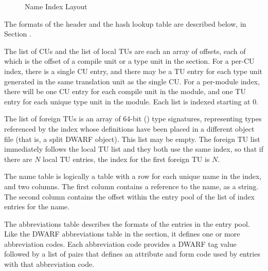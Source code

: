 \begin{figure}[p]
\begin{center}
\end{center}
\caption{Name Index Layout}
\label{fig:nameindexlayout}

\end{figure}

The formats of the header and the hash lookup table are described
below, in Section .

The list of CUs and the list of local TUs are each an array of
offsets, each of which is the offset of a compile unit or a type unit
in the \dotdebuginfo{} section. For a per-CU index, there is a single CU
entry, and there may be a TU entry for each type unit generated in the
same translation unit as the single CU. For a per-module index, there
will be one CU entry for each compile unit in the module, and one TU
entry for each unique type unit in the module. Each list is indexed
starting at 0.

The list of foreign TUs is an array of 64-bit (\DWFORMrefsigeight) type
signatures, representing types referenced by the index whose
definitions have been placed in a different object file (that is, a split
DWARF object). This list may be empty. 
The foreign TU list immediately follows the local TU list 
and they both use the same index, so that if there are $N$ local TU entries, 
the index for the first foreign TU is $N$.

The name table is logically a table with a row for each unique name in
the index, and two columns. The first column contains a reference to
the name, as a string. The second column contains the offset within
the entry pool of the list of index entries for the name.

The abbreviations table describes the formats of the entries in the
entry pool. Like the DWARF abbreviations table in the \dotdebugabbrev{}
section, it defines one or more abbreviation codes. Each abbreviation
code provides a DWARF tag value followed by a list of pairs that
defines an attribute and form code used by entries with that
abbreviation code.

